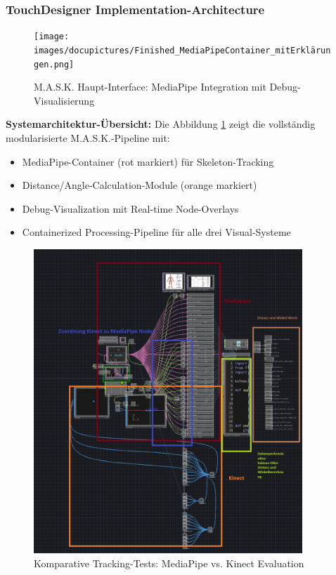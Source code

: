 \subsubsection{TouchDesigner Implementation-Architecture}

\begin{figure}[H]
    \centering
    \texttt{[image: images/docupictures/Finished\_MediaPipeContainer\_mitErklärungen.png]}
    \caption{M.A.S.K. Haupt-Interface: MediaPipe Integration mit Debug-Visualisierung}
    \label{fig:main_interface}
\end{figure}

\textbf{Systemarchitektur-Übersicht:}
Die Abbildung \ref{fig:main_interface} zeigt die vollständig modularisierte M.A.S.K.-Pipeline mit:
\begin{itemize}
    \item MediaPipe-Container (rot markiert) für Skeleton-Tracking
    \item Distance/Angle-Calculation-Module (orange markiert)
    \item Debug-Visualization mit Real-time Node-Overlays
    \item Containerized Processing-Pipeline für alle drei Visual-Systeme
\end{itemize}

\begin{figure}[H]
    \centering
    \includegraphics[width=0.9\textwidth]{images/docupictures/KinectMediaPipe_Testing.png}
    \caption{Komparative Tracking-Tests: MediaPipe vs. Kinect Evaluation}
    \label{fig:tracking_comparison}
\end{figure}

